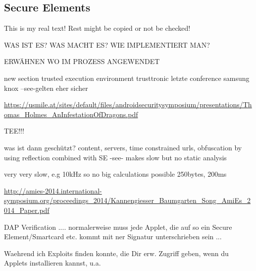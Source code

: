 \subsection{Secure Elements}\label{subsection:counter-external-secure}
This is my real text! Rest might be copied or not be checked!

WAS IST ES?
WAS MACHT ES?
WIE IMPLEMENTIERT MAN?



ERWÄHNEN WO IM PROZESS ANGEWENDET\newline

new section trusted execution environment
trusttronic letzte conference
samsung knox
--see-gelten eher sicher

\url{https://usmile.at/sites/default/files/androidsecuritysymposium/presentations/Thomas_Holmes_AnInfestationOfDragons.pdf}


TEE!!!

was ist dann geschützt? content, servers, time constrained urls, obfuscation by using reflection combined with SE -see- makes slow but no static analysis\newline

very very slow, e.g 10kHz so no big calculations possible\newline
250bytes, 200ms \newline

\url{http://amies-2014.international-symposium.org/proceedings_2014/Kannengiesser_Baumgarten_Song_AmiEs_2014_Paper.pdf}\newline

DAP Verification .... normalerweise muss jede Applet, die auf so ein Secure Element/Smartcard etc. kommt mit ner Signatur unterschrieben sein ...


Waehrend ich Exploits finden konnte, die Dir erw. Zugriff geben, wenn du Applets installieren kannst, u.a.
